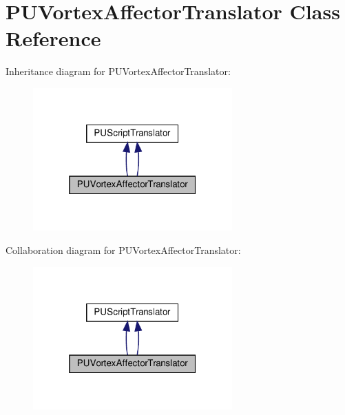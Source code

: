\hypertarget{classPUVortexAffectorTranslator}{}\section{P\+U\+Vortex\+Affector\+Translator Class Reference}
\label{classPUVortexAffectorTranslator}


Inheritance diagram for P\+U\+Vortex\+Affector\+Translator\+:
\nopagebreak
\begin{figure}[H]
\begin{center}
\leavevmode
\includegraphics[width=217pt]{classPUVortexAffectorTranslator__inherit__graph}
\end{center}
\end{figure}


Collaboration diagram for P\+U\+Vortex\+Affector\+Translator\+:
\nopagebreak
\begin{figure}[H]
\begin{center}
\leavevmode
\includegraphics[width=217pt]{classPUVortexAffectorTranslator__coll__graph}
\end{center}
\end{figure}
